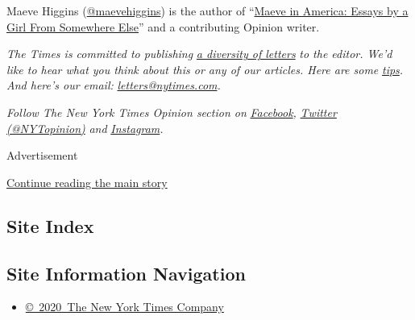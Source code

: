 Maeve Higgins (\href{https://twitter.com/maevehiggins}{@maevehiggins})
is the author of
``\href{https://www.penguinrandomhouse.com/books/546681/maeve-in-america-by-maeve-higgins/}{Maeve
in America: Essays by a Girl From Somewhere Else}'' and a contributing
Opinion writer.

\emph{The Times is committed to publishing}
\href{https://www.nytimes.com/2019/01/31/opinion/letters/letters-to-editor-new-york-times-women.html}{\emph{a
diversity of letters}} \emph{to the editor. We'd like to hear what you
think about this or any of our articles. Here are some}
\href{https://help.nytimes.com/hc/en-us/articles/115014925288-How-to-submit-a-letter-to-the-editor}{\emph{tips}}\emph{.
And here's our email:}
\href{mailto:letters@nytimes.com}{\emph{letters@nytimes.com}}\emph{.}

\emph{Follow The New York Times Opinion section on}
\href{https://www.facebook.com/nytopinion}{\emph{Facebook}}\emph{,}
\href{http://twitter.com/NYTOpinion}{\emph{Twitter (@NYTopinion)}}
\emph{and}
\href{https://www.instagram.com/nytopinion/}{\emph{Instagram}}\emph{.}

Advertisement

\protect\hyperlink{after-bottom}{Continue reading the main story}

\hypertarget{site-index}{%
\subsection{Site Index}\label{site-index}}

\hypertarget{site-information-navigation}{%
\subsection{Site Information
Navigation}\label{site-information-navigation}}

\begin{itemize}
\tightlist
\item
  \href{https://help.nytimes.com/hc/en-us/articles/115014792127-Copyright-notice}{©~2020~The
  New York Times Company}
\end{itemize}

